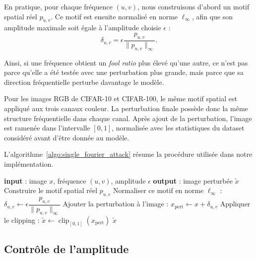 En pratique, pour chaque fréquence $(u,v)$, nous construisons d'abord un motif spatial réel
$p_{u,v}$. Ce motif est ensuite normalisé en norme $\ell_\infty$, afin que son amplitude maximale
soit égale à l'amplitude choisie $\epsilon$ :
\begin{equation}
    \delta_{u,v}
    =
    \epsilon
    \frac{p_{u,v}}{\|p_{u,v}\|_\infty}.
    \label{eq:normalisation_sfa}
\end{equation}

Ainsi, si une fréquence obtient un \textit{fool ratio} plus élevé qu'une autre,
ce n'est pas parce qu'elle a été testée avec une perturbation plus grande, mais parce que sa direction
fréquentielle perturbe davantage le modèle.

Pour les images RGB de CIFAR-10 et CIFAR-100, le même motif spatial est appliqué aux trois canaux
couleur.
La perturbation finale possède donc la même structure fréquentielle dans chaque canal. Après ajout
de la perturbation, l'image est ramenée dans l'intervalle $[0,1]$, normalisée avec les statistiques du dataset considéré 
avant d'être donnée au modèle.

L'algorithme~\ref{algo:single_fourier_attack} résume la procédure utilisée dans notre implémentation.

\begin{algorithm}[H]
\caption{Single Fourier Attack utilisée dans notre protocole}
\label{algo:single_fourier_attack}
\begin{algorithmic}
\State \textbf{input} : image $x$, fréquence $(u,v)$, amplitude $\epsilon$
\State \textbf{output} : image perturbée $\tilde{x}$
\State
\State Construire le motif spatial réel $p_{u,v}$
\State Normaliser ce motif en norme $\ell_\infty$ :
\State \hspace{0.5cm} $\delta_{u,v} \leftarrow \epsilon \dfrac{p_{u,v}}{\|p_{u,v}\|_\infty}$
\State Ajouter la perturbation à l'image :
\State \hspace{0.5cm} $x_{\mathrm{pert}} \leftarrow x + \delta_{u,v}$
\State Appliquer le clipping :
\State \hspace{0.5cm} $\tilde{x} \leftarrow \operatorname{clip}_{[0,1]}(x_{\mathrm{pert}})$
\State \Return $\tilde{x}$
\end{algorithmic}
\end{algorithm}

\subsection{Contrôle de l'amplitude}

